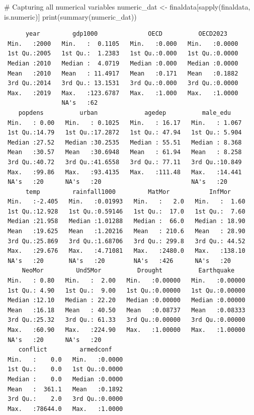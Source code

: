 \documentclass[
  11pt,
  letterpaper,
  DIV=11,
  numbers=noendperiod]{scrartcl}
\newenvironment{Shaded}{\begin{snugshade}}{\end{snugshade}}
\newcommand{\CommentTok}[1]{\textcolor[rgb]{0.37,0.37,0.37}{#1}}
\newcommand{\FunctionTok}[1]{\textcolor[rgb]{0.28,0.35,0.67}{#1}}
\newcommand{\NormalTok}[1]{\textcolor[rgb]{0.00,0.23,0.31}{#1}}
\newcommand{\OtherTok}[1]{\textcolor[rgb]{0.00,0.23,0.31}{#1}}
\begin{document}
\begin{Shaded}
\begin{Highlighting}[]
\CommentTok{\# Capturing all numerical variables}
\NormalTok{numeric\_dat }\OtherTok{\textless{}{-}}\NormalTok{ finaldata[}\FunctionTok{sapply}\NormalTok{(finaldata, is.numeric)]}
\FunctionTok{print}\NormalTok{(}\FunctionTok{summary}\NormalTok{(numeric\_dat))}
\end{Highlighting}
\end{Shaded}

\begin{verbatim}
      year         gdp1000              OECD          OECD2023     
 Min.   :2000   Min.   :  0.1105   Min.   :0.000   Min.   :0.0000  
 1st Qu.:2005   1st Qu.:  1.2383   1st Qu.:0.000   1st Qu.:0.0000  
 Median :2010   Median :  4.0719   Median :0.000   Median :0.0000  
 Mean   :2010   Mean   : 11.4917   Mean   :0.171   Mean   :0.1882  
 3rd Qu.:2014   3rd Qu.: 13.1531   3rd Qu.:0.000   3rd Qu.:0.0000  
 Max.   :2019   Max.   :123.6787   Max.   :1.000   Max.   :1.0000  
                NA's   :62                                         
    popdens          urban             agedep          male_edu     
 Min.   : 0.00   Min.   : 0.1025   Min.   : 16.17   Min.   : 1.067  
 1st Qu.:14.79   1st Qu.:17.2872   1st Qu.: 47.94   1st Qu.: 5.904  
 Median :27.52   Median :30.2535   Median : 55.51   Median : 8.368  
 Mean   :30.57   Mean   :30.6948   Mean   : 61.94   Mean   : 8.258  
 3rd Qu.:40.72   3rd Qu.:41.6558   3rd Qu.: 77.11   3rd Qu.:10.849  
 Max.   :99.86   Max.   :93.4135   Max.   :111.48   Max.   :14.441  
 NA's   :20      NA's   :20                         NA's   :20      
      temp         rainfall1000         MatMor           InfMor      
 Min.   :-2.405   Min.   :0.01993   Min.   :   2.0   Min.   :  1.60  
 1st Qu.:12.928   1st Qu.:0.59146   1st Qu.:  17.0   1st Qu.:  7.60  
 Median :21.958   Median :1.01288   Median :  66.0   Median : 18.90  
 Mean   :19.625   Mean   :1.20216   Mean   : 210.6   Mean   : 28.90  
 3rd Qu.:25.869   3rd Qu.:1.68706   3rd Qu.: 299.8   3rd Qu.: 44.52  
 Max.   :29.676   Max.   :4.71081   Max.   :2480.0   Max.   :138.10  
 NA's   :20       NA's   :20        NA's   :426      NA's   :20      
     NeoMor         Und5Mor          Drought          Earthquake     
 Min.   : 0.80   Min.   :  2.00   Min.   :0.00000   Min.   :0.00000  
 1st Qu.: 4.90   1st Qu.:  9.00   1st Qu.:0.00000   1st Qu.:0.00000  
 Median :12.10   Median : 22.20   Median :0.00000   Median :0.00000  
 Mean   :16.18   Mean   : 40.50   Mean   :0.08737   Mean   :0.08333  
 3rd Qu.:25.32   3rd Qu.: 61.33   3rd Qu.:0.00000   3rd Qu.:0.00000  
 Max.   :60.90   Max.   :224.90   Max.   :1.00000   Max.   :1.00000  
 NA's   :20      NA's   :20                                          
    conflict         armedconf     
 Min.   :    0.0   Min.   :0.0000  
 1st Qu.:    0.0   1st Qu.:0.0000  
 Median :    0.0   Median :0.0000  
 Mean   :  361.1   Mean   :0.1892  
 3rd Qu.:    2.0   3rd Qu.:0.0000  
 Max.   :78644.0   Max.   :1.0000  
                                   
\end{verbatim}
\end{document}
